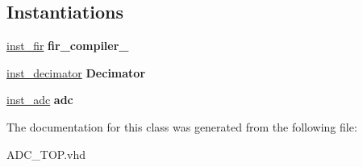 \subsection*{Instantiations}
 \begin{DoxyCompactItemize}
\item 
\hypertarget{class_a_d_c___t_o_p_1_1_behavioral_ac73cf8935dedab76f112412cbd61330d}{\hyperlink{class_a_d_c___t_o_p_1_1_behavioral_ac73cf8935dedab76f112412cbd61330d}{inst\-\_\-fir}  {\bfseries fir\-\_\-compiler\-\_}   }\label{class_a_d_c___t_o_p_1_1_behavioral_ac73cf8935dedab76f112412cbd61330d}

\item 
\hypertarget{class_a_d_c___t_o_p_1_1_behavioral_a88ce14eff4411074db8fb7cd2d814bc8}{\hyperlink{class_a_d_c___t_o_p_1_1_behavioral_a88ce14eff4411074db8fb7cd2d814bc8}{inst\-\_\-decimator}  {\bfseries Decimator}   }\label{class_a_d_c___t_o_p_1_1_behavioral_a88ce14eff4411074db8fb7cd2d814bc8}

\item 
\hypertarget{class_a_d_c___t_o_p_1_1_behavioral_ad035aeedbb36bd6303acc72526b48022}{\hyperlink{class_a_d_c___t_o_p_1_1_behavioral_ad035aeedbb36bd6303acc72526b48022}{inst\-\_\-adc}  {\bfseries adc}   }\label{class_a_d_c___t_o_p_1_1_behavioral_ad035aeedbb36bd6303acc72526b48022}

\end{DoxyCompactItemize}


The documentation for this class was generated from the following file\-:\begin{DoxyCompactItemize}
\item 
A\-D\-C\-\_\-\-T\-O\-P.\-vhd\end{DoxyCompactItemize}
